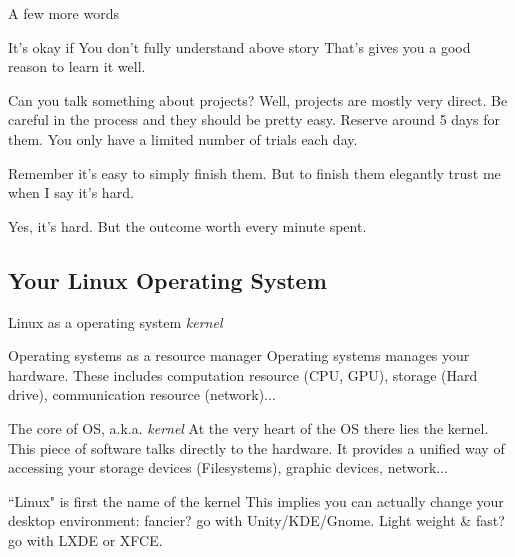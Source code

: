 \begin{frame}{A few more words}
\begin{block}{It's okay if You don't fully understand above story}
	That's gives you a good reason to learn it well.
\end{block}
\begin{block}{Can you talk something about projects?}
	Well, projects are mostly very direct. Be careful in the process and they should be pretty easy. Reserve around 5 days for them. You only have a limited number of trials each day. 
	
	Remember it's easy to simply finish them. But to finish them elegantly trust me when I say it's hard. 
	
	Yes, it's hard. But the outcome worth every minute spent.
\end{block}
\end{frame}

\subsection{Your Linux Operating System}
\begin{frame}{Linux as a operating system \textit{kernel}}
\begin{block}{Operating systems as a resource manager}
	Operating systems manages your hardware. These includes computation resource (CPU, GPU), storage (Hard drive), communication resource (network)...
\end{block}
\begin{block}{The core of OS, a.k.a. \textit{kernel}}
	At the very heart of the OS there lies the kernel. This piece of software talks directly to the hardware. It provides a unified way of accessing your storage devices (Filesystems), graphic devices, network...
\end{block}
\begin{block}{``Linux" is first the name of the kernel}
	This implies you can actually change your desktop environment: fancier? go with Unity/KDE/Gnome. Light weight \& fast? go with LXDE or XFCE. 
\end{block}
\end{frame}

